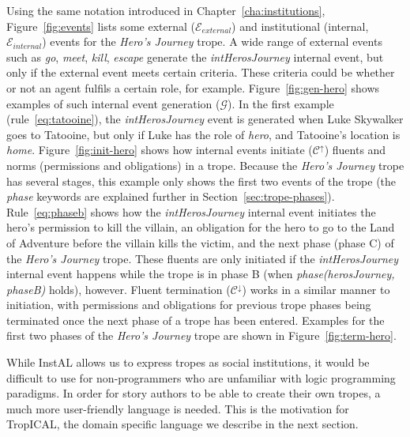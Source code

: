 \documentclass[11pt]{report}
\begin{document}
Using the same notation introduced in Chapter~\ref{cha:institutions}, Figure~\ref{fig:events} lists some external ($\mathcal{E}_{external}$) and institutional (internal, $\mathcal{E}_{internal}$) events for the \emph{Hero's Journey} trope. A wide range of external events such as \emph{go}, \emph{meet}, \emph{kill}, \emph{escape} generate the \emph{intHerosJourney} internal event, but only if the external event meets certain criteria. These criteria could be whether or not an agent fulfils a certain role, for example. Figure~\ref{fig:gen-hero} shows examples of such internal event generation ($\mathcal{G}$). In the first example (rule~\ref{eq:tatooine}), the \emph{intHerosJourney} event is generated when Luke Skywalker goes to Tatooine, but only if Luke has the role of \emph{hero}, and Tatooine's location is \emph{home}.
Figure~\ref{fig:init-hero} shows how internal events initiate
($\mathcal{C^{\uparrow}}$) fluents and norms (permissions and obligations) in a
trope. Because the \emph{Hero's Journey} trope has several stages, this example
only shows the first two events of the trope (the \emph{phase} keywords are explained further in Section~\ref{sec:trope-phases}). Rule~\ref{eq:phaseb} shows how the \emph{intHerosJourney} internal event initiates the hero's permission to kill the villain, an obligation for the hero to go to the Land of Adventure before the villain kills the victim, and the next phase (phase C) of the \emph{Hero's Journey} trope. These fluents are only initiated if the \emph{intHerosJourney} internal event happens while the trope is in phase B (when \emph{phase(herosJourney, phaseB)} holds), however.
Fluent termination ($\mathcal{C^{\downarrow}}$) works in a similar manner to initiation, with permissions and obligations for previous trope phases being terminated once the next phase of a trope has been entered. Examples for the first two phases of the \emph{Hero's Journey} trope are shown in Figure~\ref{fig:term-hero}.

While InstAL allows us to express tropes as social institutions, it would be difficult to use for non-programmers who are unfamiliar with logic programming paradigms. In order for story authors to be able to create their own tropes, a much more user-friendly language is needed. This is the motivation for TropICAL, the domain specific language we describe in the next section.
\end{document}
